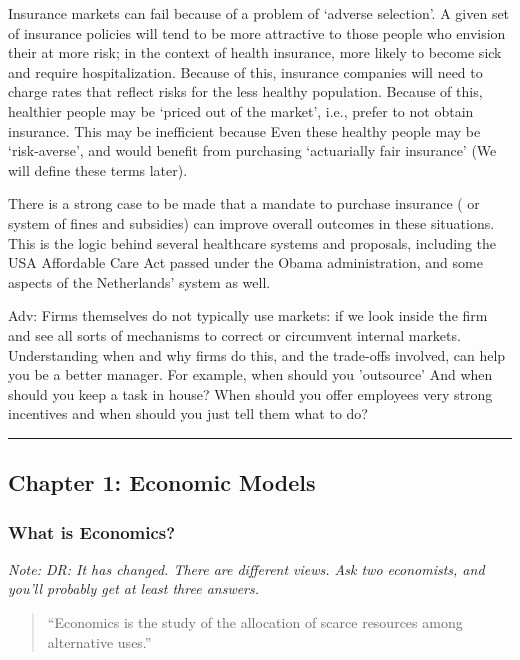 \documentclass[]{article}
\begin{document}
Insurance markets can fail because of a problem of `adverse selection'.
A given set of insurance policies will tend to be more attractive to
those people who envision their at more risk; in the context of health
insurance, more likely to become sick and require hospitalization.
Because of this, insurance companies will need to charge rates that
reflect risks for the less healthy population. Because of this,
healthier people may be `priced out of the market', i.e., prefer to not
obtain insurance. This may be inefficient because Even these healthy
people may be `risk-averse', and would benefit from purchasing
`actuarially fair insurance' (We will define these terms later).

There is a strong case to be made that a mandate to purchase insurance (
or system of fines and subsidies) can improve overall outcomes in these
situations. This is the logic behind several healthcare systems and
proposals, including the USA Affordable Care Act passed under the Obama
administration, and some aspects of the Netherlands' system as well.

\textcolor{RawSienna}{Adv: Firms themselves do not typically use markets: if we look inside the firm and see all sorts of mechanisms to correct or circumvent internal markets. Understanding when and why firms do this, and the trade-offs involved, can help you be a better manager. For example, when should you 'outsource' And when should you keep a task in house? When should you offer employees very strong incentives and when should you just tell them what to do?}

\begin{center}\rule{0.5\linewidth}{\linethickness}\end{center}

\hypertarget{chapter-1-economic-models}{%
\subsection{Chapter 1: Economic
Models}\label{chapter-1-economic-models}}

\hypertarget{what-is-economics}{%
\subsubsection{What is Economics?}\label{what-is-economics}}

\emph{Note: DR: It has changed. There are different views. Ask two
economists, and you'll probably get at least three answers.}

\begin{quote}
``Economics is the study of the allocation of scarce resources among
alternative uses.''
\end{quote}
\end{document}
